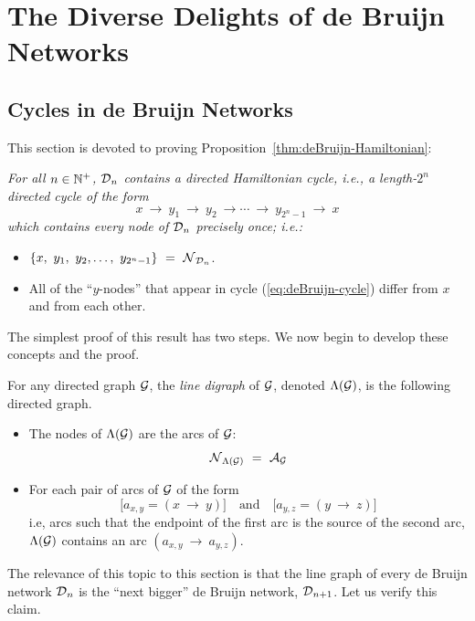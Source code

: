 \chapter{The Diverse Delights of de Bruijn Networks}
\label{ch:de-Bruijn-delights}

\section{Cycles in de Bruijn Networks}
\label{Appendix:deBruijn-Hamiltonian}

This section is devoted to proving Proposition~\ref{thm:deBruijn-Hamiltonian}:

\noindent
{\em
For all $n \in \mathbb{N}^+$, $\mbox{$\cal D$}_n$ contains a {\em directed Hamiltonian
  cycle}, i.e., a length-$2^n$ directed cycle of the form
\[
 x \ \rightarrow \ y_1 \ \rightarrow \ y_2 \ \rightarrow \cdots
\ \rightarrow \ y_{2^n-1} \ \rightarrow \ x
\]
which contains every node of $\mbox{$\cal D$}_n$ precisely once; i.e.:
\begin{itemize}
\item
$\{x, \ y_1, \ y_2, \ldots, \ y_{2^n-1}\} \ = \ \n_{\fd_n}$.
\item
All of the ``$y$-nodes'' that appear in cycle
(\ref{eq:deBruijn-cycle}) differ from $x$ and from each other.
\end{itemize}
}

The simplest proof of this result has two steps.  We now begin to develop these concepts and the proof.

\bigskip

%
For any directed graph $\mbox{$\cal G$}$, the {\it line digraph} 
 of $\mbox{$\cal G$}$, denoted $\Lambda(\mbox{$\cal G$})$, is the following
directed graph.
\begin{itemize}
\item
The nodes of $\Lambda(\mbox{$\cal G$})$ are the arcs of $\mbox{$\cal G$}$:
\[ \n_{{\Lambda}({\cal G})} \ = \ \a_{\fg} \]
\item
For each pair of arcs of $\mbox{$\cal G$}$ of the form
\[ \big[a_{x,y} = (x \ \rightarrow \ y) \big] \ \ \ \mbox{ and } \ \ \ 
\big[a_{y,z} = (y \ \rightarrow \ z) \big]
\]
i.e, arcs such that the endpoint of the first arc is the source of the
second arc, $\Lambda(\mbox{$\cal G$})$ contains an arc $(a_{x,y} \ \rightarrow
\ a_{y,z})$.
\end{itemize}
The relevance of this topic to this section is that the line graph of
every de Bruijn network $\mbox{$\cal D$}_n$ is the ``next bigger'' de Bruijn
network, $\mbox{$\cal D$}_{n+1}$.  Let us verify this claim.

